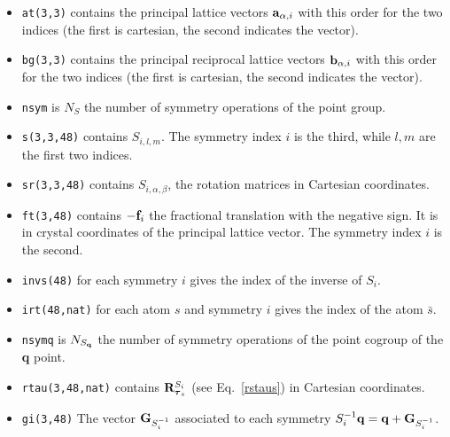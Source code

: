 \documentclass[12pt,a4paper,twoside]{report}
\begin{document}
\begin{itemize}

\item
\texttt{at(3,3)} contains the principal lattice vectors ${\bf a}_{\alpha,i}$ with this order for the two indices (the first is cartesian, the second indicates the vector). 

\item
\texttt{bg(3,3)} contains the principal reciprocal lattice vectors ${\bf b}_{\alpha,i}$ with this order for the two indices (the first is cartesian, the second indicates the vector).

\item 
\texttt{nsym} is $N_S$ the number of symmetry operations of the point group.

\item
\texttt{s(3,3,48)} contains $S_{i,l,m}$. The symmetry index $i$ is the third, while $l,m$ are the first two indices.

\item
\texttt{sr(3,3,48)} contains $S_{i,\alpha,\beta}$, the rotation matrices in Cartesian coordinates.

\item
\texttt{ft(3,48)} contains $-{\bf f}_i$ the fractional translation with the negative sign.
It is in crystal coordinates of the principal lattice vector. The symmetry index $i$ is the second.

\item
\texttt{invs(48)} for each symmetry $i$ gives the index of the inverse of $S_i$.

\item
\texttt{irt(48,nat)} for each atom $s$ and symmetry $i$ gives the index of the atom $\bar s$.

\item 
\texttt{nsymq} is $N_{S_{\bf q}}$ the number of symmetry operations of the point cogroup of the
{\bf q} point.

\item 
\texttt{rtau(3,48,nat)} contains ${\bf R}^{S_i}_{\boldsymbol{\tau}_s}$ (see Eq.~\ref{rstaus}) in Cartesian coordinates.

\item
\texttt{gi(3,48)} The vector ${\bf G}_{S_i^{-1}}$
associated to each symmetry $S_i^{-1}{\bf q}={\bf q}+{\bf G}_{S_i^{-1}}$.

\end{itemize}
\end{document}
